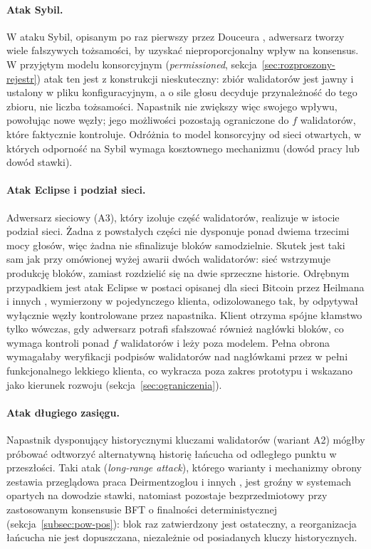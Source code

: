 \paragraph{Atak Sybil.} W ataku Sybil, opisanym po raz pierwszy przez Douceura \cite{douceur2002sybil}, adwersarz tworzy wiele fałszywych tożsamości, by uzyskać nieproporcjonalny wpływ na konsensus. W przyjętym modelu konsorcyjnym (\emph{permissioned}, sekcja~\ref{sec:rozproszony-rejestr}) atak ten jest z konstrukcji nieskuteczny: zbiór walidatorów jest jawny i ustalony w pliku konfiguracyjnym, a o sile głosu decyduje przynależność do tego zbioru, nie liczba tożsamości. Napastnik nie zwiększy więc swojego wpływu, powołując nowe węzły; jego możliwości pozostają ograniczone do $f$ walidatorów, które faktycznie kontroluje. Odróżnia to model konsorcyjny od sieci otwartych, w których odporność na Sybil wymaga kosztownego mechanizmu (dowód pracy lub dowód stawki).

\paragraph{Atak Eclipse i podział sieci.} Adwersarz sieciowy (A3), który izoluje część walidatorów, realizuje w istocie podział sieci. Żadna z powstałych części nie dysponuje ponad dwiema trzecimi mocy głosów, więc żadna nie sfinalizuje bloków samodzielnie. Skutek jest taki sam jak przy omówionej wyżej awarii dwóch walidatorów: sieć wstrzymuje produkcję bloków, zamiast rozdzielić się na dwie sprzeczne historie. Odrębnym przypadkiem jest atak Eclipse w postaci opisanej dla sieci Bitcoin przez Heilmana i innych \cite{heilman2015eclipse}, wymierzony w pojedynczego klienta, odizolowanego tak, by odpytywał wyłącznie węzły kontrolowane przez napastnika. Klient otrzyma spójne kłamstwo tylko wówczas, gdy adwersarz potrafi sfałszować również nagłówki bloków, co wymaga kontroli ponad $f$ walidatorów i leży poza modelem. Pełna obrona wymagałaby weryfikacji podpisów walidatorów nad nagłówkami przez w pełni funkcjonalnego lekkiego klienta, co wykracza poza zakres prototypu i wskazano jako kierunek rozwoju (sekcja~\ref{sec:ograniczenia}).

\paragraph{Atak długiego zasięgu.} Napastnik dysponujący historycznymi kluczami walidatorów (wariant A2) mógłby próbować odtworzyć alternatywną historię łańcucha od odległego punktu w przeszłości. Taki atak (\emph{long-range attack}), którego warianty i mechanizmy obrony zestawia przeglądowa praca Deirmentzoglou i innych \cite{deirmentzoglou2019longrange}, jest groźny w systemach opartych na dowodzie stawki, natomiast pozostaje bezprzedmiotowy przy zastosowanym konsensusie BFT o finalności deterministycznej (sekcja~\ref{subsec:pow-pos}): blok raz zatwierdzony jest ostateczny, a reorganizacja łańcucha nie jest dopuszczana, niezależnie od posiadanych kluczy historycznych.

